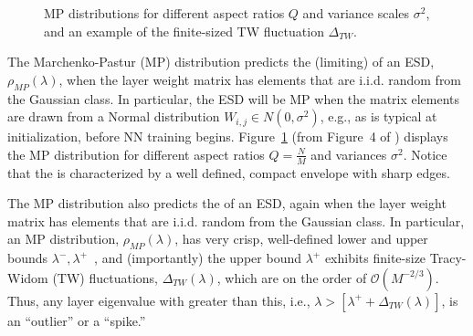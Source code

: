 \begin{figure}[t] %
    \centering  
    \caption{MP distributions for different aspect ratios $Q$ and variance scales $\sigma^2$, and an example of the finite-sized TW fluctuation $\Delta_{TW}$. }
   \label{fig:MP-esds}
\end{figure}

The Marchenko-Pastur (MP) distribution predicts the (limiting) \SHAPE of an ESD, $\rho_{MP}(\lambda)$, when the layer weight matrix has elements that are i.i.d. random from the Gaussian \Universality class.
In particular, the ESD will be MP when the matrix elements are drawn from a Normal distribution $W_{i,j}\in  N(0,\sigma^{2})$, e.g., as is typical at initialization, before NN training begins.
Figure~\ref{fig:MP-esds} (from Figure~4 of \cite{MM18_TR_JMLRversion}) displays the MP distribution for different aspect ratios $Q=\tfrac{N}{M}$ and variances $\sigma^{2}$.  
Notice that the \SHAPE is characterized by a well defined, compact envelope with sharp edges.

The MP distribution also predicts the \SCALE of an ESD, again when the layer weight matrix has elements that are i.i.d. random from the Gaussian \Universality class.
In particular, an MP distribution, $\rho_{MP}(\lambda)$, has very crisp, well-defined lower and upper bounds $\lambda^{-},\lambda^{+}$~\cite{MM18_TR_JMLRversion}, and (importantly) the upper bound $\lambda^{+}$ exhibits finite-size Tracy-Widom (TW) fluctuations, $\Delta_{TW}(\lambda)$, which are on the order of $\mathcal{O}(M^{-2/3})$. 
Thus, any layer eigenvalue with \SCALE greater than this, i.e., $\lambda>[\lambda^{+}+\Delta_{TW}(\lambda)]$, is an ``outlier'' or a ``spike.''

